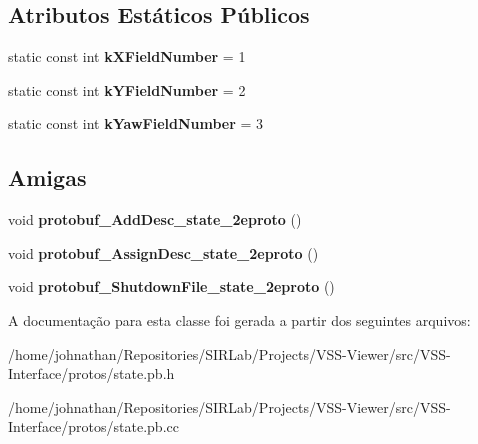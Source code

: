 \subsection*{Atributos Estáticos Públicos}
\begin{DoxyCompactItemize}
\item 
static const int {\bfseries k\+X\+Field\+Number} = 1\hypertarget{classvss__state_1_1Pose_a55da0ea3762949322b44da8206bb84f0}{}\label{classvss__state_1_1Pose_a55da0ea3762949322b44da8206bb84f0}

\item 
static const int {\bfseries k\+Y\+Field\+Number} = 2\hypertarget{classvss__state_1_1Pose_a0a2f401726b1453c65cbaa99fde61b4e}{}\label{classvss__state_1_1Pose_a0a2f401726b1453c65cbaa99fde61b4e}

\item 
static const int {\bfseries k\+Yaw\+Field\+Number} = 3\hypertarget{classvss__state_1_1Pose_a4f1b9b7cb0a470421a29a733329a7e7c}{}\label{classvss__state_1_1Pose_a4f1b9b7cb0a470421a29a733329a7e7c}

\end{DoxyCompactItemize}
\subsection*{Amigas}
\begin{DoxyCompactItemize}
\item 
void {\bfseries protobuf\+\_\+\+Add\+Desc\+\_\+state\+\_\+2eproto} ()\hypertarget{classvss__state_1_1Pose_aab1a2c258f8122a403a979ff57e2a706}{}\label{classvss__state_1_1Pose_aab1a2c258f8122a403a979ff57e2a706}

\item 
void {\bfseries protobuf\+\_\+\+Assign\+Desc\+\_\+state\+\_\+2eproto} ()\hypertarget{classvss__state_1_1Pose_a57d9367bc8a7a94ead11d11194cca1b6}{}\label{classvss__state_1_1Pose_a57d9367bc8a7a94ead11d11194cca1b6}

\item 
void {\bfseries protobuf\+\_\+\+Shutdown\+File\+\_\+state\+\_\+2eproto} ()\hypertarget{classvss__state_1_1Pose_a4e6dc5e8e72799859c4e9556d090e57d}{}\label{classvss__state_1_1Pose_a4e6dc5e8e72799859c4e9556d090e57d}

\end{DoxyCompactItemize}


A documentação para esta classe foi gerada a partir dos seguintes arquivos\+:\begin{DoxyCompactItemize}
\item 
/home/johnathan/\+Repositories/\+S\+I\+R\+Lab/\+Projects/\+V\+S\+S-\/\+Viewer/src/\+V\+S\+S-\/\+Interface/protos/state.\+pb.\+h\item 
/home/johnathan/\+Repositories/\+S\+I\+R\+Lab/\+Projects/\+V\+S\+S-\/\+Viewer/src/\+V\+S\+S-\/\+Interface/protos/state.\+pb.\+cc\end{DoxyCompactItemize}
